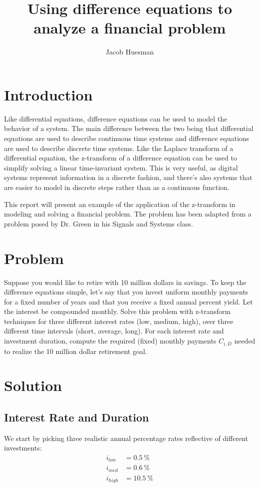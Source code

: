 \documentclass[letterpaper]{article}
\author{Jacob Huesman}
\title{Using difference equations to analyze a financial problem}
\begin{document}
\maketitle


\section{Introduction}
Like differential equations, difference equations can be used to model the behavior of a system. The main difference between the two being that differential equations are used to describe continuous time systems and difference equations are used to describe discrete time systems. Like the Laplace transform of a differential equation, the z-transform of a difference equation can be used to simplify solving a linear time-invariant system. This is very useful, as digital systems represent information in a discrete fashion, and there's also systems that are easier to model in discrete steps rather than as a continuous function.

This report will present an example of the application of the z-transform in modeling and solving a financial problem. The problem has been adapted from a problem posed by Dr. Green in his Signals and Systems class.

\section{Problem}
Suppose you would like to retire with 10 million dollars in savings. To keep the difference equations simple, let's say that you invest uniform monthly payments for a fixed number of years and that you receive a fixed annual percent yield. Let the interest be compounded monthly. Solve this problem with z-transform techniques for three different interest rates (low, medium, high), over three different time intervals (short, average, long). For each interest rate and investment duration, compute the required (fixed) monthly payments $C_{i,D}$ needed to realize the 10 million dollar retirement goal.

\section{Solution}
\subsection{Interest Rate and Duration}
We start by picking three realistic annual percentage rates reflective of different investments:
\begin{align*}
	i_{low}  &= \SI{0.5}{\%}  \\
	i_{med}  &= \SI{0.6}{\%}  \\
	i_{high} &= \SI{10.5}{\%}
\end{align*}
\end{document}
